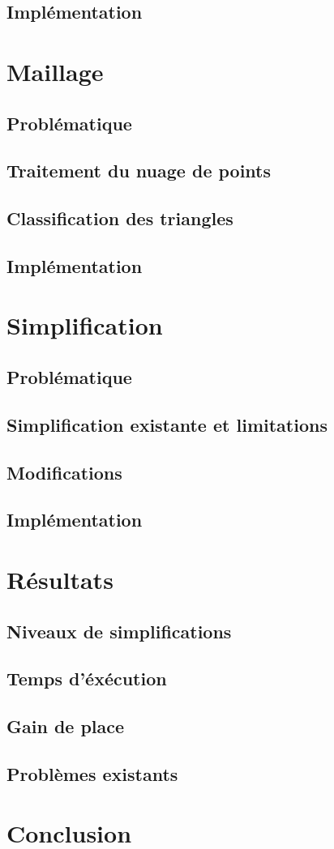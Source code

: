 \documentclass[12pt, twoside]{article}
\let\oldsection\section
\def\section{\cleardoublepage\oldsection}
\begin{document}
\subsection{Implémentation}

\section{Maillage}
\subsection{Problématique}
\subsection{Traitement du nuage de points}
\subsection{Classification des triangles}
\subsection{Implémentation}

\section{Simplification}
\subsection{Problématique}
\subsection{Simplification existante et limitations}
\subsection{Modifications}
\subsection{Implémentation}

\section{Résultats}
\subsection{Niveaux de simplifications}
\subsection{Temps d'éxécution}
\subsection{Gain de place}
\subsection{Problèmes existants}

\newpage
\section*{Conclusion}

\newpage


\end{document}
